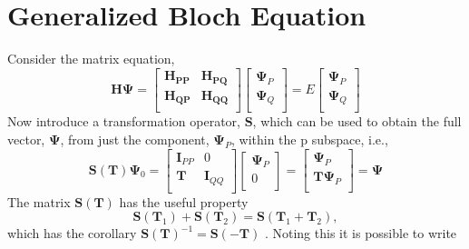 \section{ Generalized Bloch Equation } 
Consider the matrix equation,
\begin{equation}
\mathbf{H}\boldsymbol{\Psi} =
\begin{bmatrix}
 \mathbf{H_{PP}} & \mathbf{H_{PQ}} \\ 
 \mathbf{H_{QP}} & \mathbf{H_{QQ}} \\ 
\end{bmatrix} 
\begin{bmatrix}
 \boldsymbol{\Psi}_{P} \\ 
 \boldsymbol{\Psi}_{Q} \\ 
\end{bmatrix} 
= E 
\begin{bmatrix}
 \boldsymbol{\Psi}_{P} \\ 
 \boldsymbol{\Psi}_{Q} \\ 
\end{bmatrix} 
\end{equation}
Now introduce a transformation operator, $\mathbf{S}$, which can be used to obtain the full 
vector, $\boldsymbol{\Psi}$, from just the component, $\boldsymbol{\Psi}_{P}$, within the $\mathrm{p}$ subspace, i.e.,
\begin{equation}
\mathbf{S}(\mathbf{T})\boldsymbol{\Psi}_{0}= 
\begin{bmatrix}
\mathbf{I}_{PP} & 0 \\ 
\mathbf{T} & \mathbf{I}_{QQ} \\ 
\end{bmatrix}
\begin{bmatrix}
\boldsymbol{\Psi}_{P} \\ 
0 \\ 
\end{bmatrix}=  
\begin{bmatrix}
\boldsymbol{\Psi}_{P} \\ 
\mathbf{T}\boldsymbol{\Psi}_{P} \\ 
\end{bmatrix} 
= \boldsymbol{\Psi}
\end{equation}
The matrix $\mathbf{S}(\mathbf{T})$ has the useful property
\begin{equation}
\mathbf{S}(\mathbf{T}_{1})+ \mathbf{S}(\mathbf{T}_{2})=\mathbf{S}(\mathbf{T}_{1}+\mathbf{T}_{2}),
\end{equation}
which has the corollary  $\mathbf{S}(\mathbf{T})^{-1}=\mathbf{S}(-\mathbf{T})$ . Noting this it is possible to write
